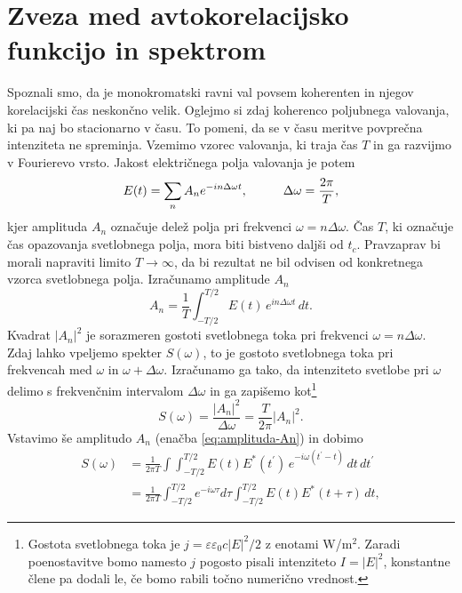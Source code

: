 \section{Zveza med avtokorelacijsko funkcijo in spektrom}

Spoznali smo, da je monokromatski ravni val povsem koherenten in njegov
korelacijski čas neskončno velik. Oglejmo si zdaj koherenco poljubnega valovanja, ki
pa naj bo stacionarno v času. To pomeni, da se v času meritve povprečna intenziteta
ne spreminja. Vzemimo vzorec valovanja, ki traja čas $T$ in ga razvijmo 
v Fourierevo vrsto. Jakost električnega polja valovanja je potem
\begin{equation}
E(t)=\sum_{n}A_{n}e^{-in\Delta\omega t},\mbox{\hskip1cm}\Delta\omega=\frac{2\pi}{T},
\end{equation}
kjer amplituda $A_{n}$ označuje delež polja pri frekvenci $\omega=n\Delta\omega$.
Čas $T$, ki označuje čas opazovanja svetlobnega polja, mora biti
bistveno daljši od $t_{c}$. Pravzaprav bi morali napraviti limito
$T\rightarrow\infty$, da bi rezultat ne bil odvisen od konkretnega
vzorca svetlobnega polja. Izračunamo amplitude $A_{n}$ 
\begin{equation}
A_{n}=\frac{1}{T}\int_{-T/2}^{T/2}E(t)\, e^{in\Delta\omega t}\, dt.\label{eq:amplituda-An}
\end{equation}
Kvadrat $|A_{n}|^{2}$ je sorazmeren gostoti svetlobnega toka pri frekvenci
$\omega=n\Delta\omega$. 
Zdaj lahko vpeljemo spekter $S(\omega)$, to
je gostoto svetlobnega toka pri frekvencah med $\omega$ in $\omega+\Delta\omega$.
Izračunamo ga tako, da intenziteto svetlobe pri $\omega$ delimo s 
frekvenčnim intervalom $\Delta\omega$ in ga zapišemo 
kot\footnote{Gostota svetlobnega toka 
je $j = \varepsilon \varepsilon_0 c |E|^2/2$
z enotami W/m$^2$. Zaradi poenostavitve bomo namesto $j$ pogosto pisali intenziteto 
$I = |E|^2$, konstantne člene pa dodali le, če bomo rabili točno numerično vrednost.} 
\begin{equation}
S(\omega)=\frac{|A_{n}|^{2}}{\Delta\omega}=\frac{T}{2\pi}|A_{n}|^{2}.
\end{equation}
Vstavimo še amplitudo $A_{n}$ (enačba \ref{eq:amplituda-An}) in dobimo 
\begin{align}
S(\omega) & =\frac{1}{2\pi T}\int\int_{-T/2}^{T/2}E(t)E^{*}(t^{\prime})\, 
e^{-i\omega(t^{\prime}-t)}\, dt\, dt^{\prime}\\
 & =\frac{1}{2\pi T}\int_{-T/2}^{T/2}e^{-i\omega\tau}d\tau\int_{-T/2}^{T/2}E(t)E^{*}(t+\tau)\, dt,
\label{eq:spekter}
\end{align}
